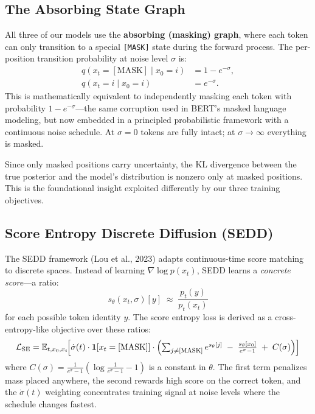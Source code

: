\documentclass[11pt,a4paper]{article}
\begin{document}
\subsection{The Absorbing State Graph}

All three of our models use the \textbf{absorbing (masking) graph}, where each token can only transition to a special \texttt{[MASK]} state during the forward process. The per-position transition probability at noise level $\sigma$ is:
\begin{align*}
  q(x_t = [\text{MASK}] \mid x_0 = i) &= 1 - e^{-\sigma}, \\
  q(x_t = i \mid x_0 = i)              &= e^{-\sigma}.
\end{align*}
This is mathematically equivalent to independently masking each token with probability $1 - e^{-\sigma}$---the same corruption used in BERT's masked language modeling, but now embedded in a principled probabilistic framework with a continuous noise schedule. At $\sigma = 0$ tokens are fully intact; at $\sigma \to \infty$ everything is masked.

Since only masked positions carry uncertainty, the KL divergence between the true posterior and the model's distribution is nonzero only at masked positions. This is the foundational insight exploited differently by our three training objectives.

\subsection{Score Entropy Discrete Diffusion (SEDD)}

The SEDD framework (Lou et al., 2023) adapts continuous-time score matching to discrete spaces. Instead of learning $\nabla \log p(x_t)$, SEDD learns a \emph{concrete score}---a ratio:
\[
  s_\theta(x_t, \sigma)[y] \;\approx\; \frac{p_t(y)}{p_t(x_t)}
\]
for each possible token identity $y$. The score entropy loss is derived as a cross-entropy-like objective over these ratios:
\[
  \mathcal{L}_\text{SE} = \mathbb{E}_{t, x_0, x_t}\!\Bigl[\dot{\sigma}(t)\cdot\mathbf{1}[x_t = [\text{MASK}]] \cdot
  \Bigl(\textstyle\sum_{j \neq [\text{MASK}]} e^{s_\theta[j]} \;-\; \frac{s_\theta[x_0]}{e^\sigma - 1} \;+\; C(\sigma)\Bigr)\Bigr]
\]
where $C(\sigma) = \frac{1}{e^\sigma-1}\!\left(\log\frac{1}{e^\sigma-1} - 1\right)$ is a constant in $\theta$. The first term penalizes mass placed anywhere, the second rewards high score on the correct token, and the $\dot{\sigma}(t)$ weighting concentrates training signal at noise levels where the schedule changes fastest.
\end{document}
